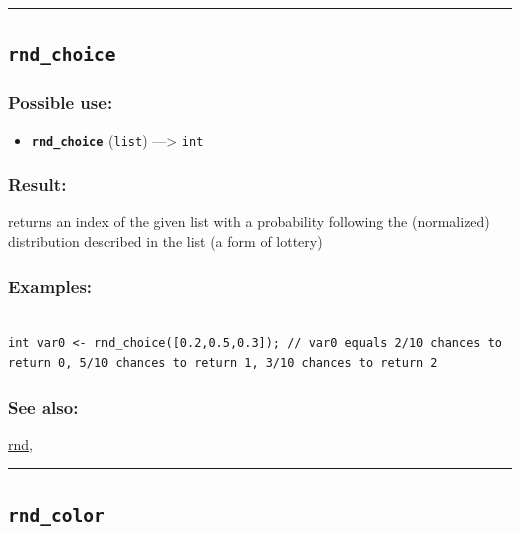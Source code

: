 \documentclass[]{book}
\providecommand{\tightlist}{%
  \setlength{\itemsep}{0pt}\setlength{\parskip}{0pt}}
\theoremstyle{definition}
\theoremstyle{definition}
\theoremstyle{definition}
\theoremstyle{remark}
\begin{document}
\begin{center}\rule{0.5\linewidth}{\linethickness}\end{center}

\subsection{\texorpdfstring{\texttt{rnd\_choice}}{rnd\_choice}}\label{rnd_choice}

\subsubsection{Possible use:}\label{possible-use-442}

\begin{itemize}
\tightlist
\item
  \textbf{\texttt{rnd\_choice}} (\texttt{list}) ---\textgreater{}
  \texttt{int}
\end{itemize}

\subsubsection{Result:}\label{result-428}

returns an index of the given list with a probability following the
(normalized) distribution described in the list (a form of lottery)

\subsubsection{Examples:}\label{examples-303}

\begin{verbatim}
 
int var0 <- rnd_choice([0.2,0.5,0.3]); // var0 equals 2/10 chances to return 0, 5/10 chances to return 1, 3/10 chances to return 2
\end{verbatim}

\subsubsection{See also:}\label{see-also-177}

\href{operators-n-to-r.html\#rnd}{rnd},

\begin{center}\rule{0.5\linewidth}{\linethickness}\end{center}

\subsection{\texorpdfstring{\texttt{rnd\_color}}{rnd\_color}}\label{rnd_color}
\end{document}
